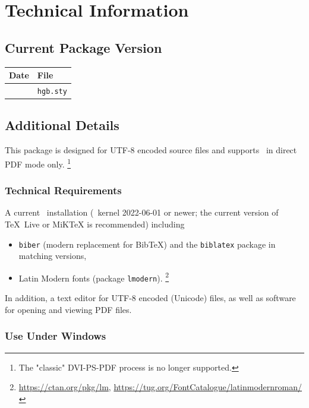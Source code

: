\chapter{Technical Information}
\label{app:TechnicalDetails}

\section{Current Package Version}

\begin{center}
	\begin{tabular}{@{}ll@{}}
		\toprule
		Date   & File            \\
		\midrule
		\hgbDate & \texttt{hgb.sty} \\
		\bottomrule
	\end{tabular}
\end{center}


\section{Additional Details}

This package is designed for \mbox{UTF-8} encoded source files and supports 
\latex\ in direct PDF mode only.%
\footnote{The "classic" DVI-PS-PDF process is no longer supported.}


\subsection{Technical Requirements}

A current \latex\ installation (\latex\ kernel 2022-06-01 or newer; the current
version of TeX~Live or MiKTeX is recommended) including
%
\begin{itemize}
		\item \texttt{biber} (modern replacement for BibTeX) and the \texttt{biblatex}
			package in matching versions,
		\item Latin Modern fonts (package \texttt{lmodern}).%
			\footnote{\url{https://ctan.org/pkg/lm},
				\url{https://tug.org/FontCatalogue/latinmodernroman/}}
\end{itemize}
%
In addition, a text editor for {UTF-8} encoded (Unicode) files, as well 
as software for opening and viewing PDF files.



\subsection{Use Under Windows}
\label{sec:UseUnderWindows}


